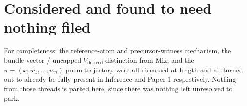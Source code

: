 \documentclass[11pt]{article}
\begin{document}
\section{Considered and found to need nothing filed}

For completeness: the reference-atom and precursor-witness mechanism,
the bundle-vector / uncapped $V_{\text{derived}}$ distinction from
Mix, and the $\pi=(x;w_1,\ldots,w_n)$ poem trajectory were all
discussed at length and all turned out to already be fully present in
Inference and Paper 1 respectively. Nothing from those threads is
parked here, since there was nothing left unresolved to park.
\end{document}
